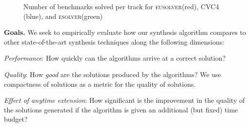 \documentclass{llncs}
\renewcommand{\paragraph}[1]{\par\noindent\textbf{#1.}}
\newcommand{\esolver}{\textsc{esolver}\xspace}
\newcommand{\eusolver}{\textsc{eusolver}\xspace}
\begin{document}
\solvedData
\begin{wrapfigure}{l}{0.4\textwidth}%
\centering
  \caption{Number of benchmarks solved per track for \eusolver (red),
  CVC4 (blue), and \esolver (green)}
    \label{fig:num_solved}
\vspace*{-1ex}
\end{wrapfigure}
\paragraph{Goals}
We seek to empirically evaluate how our synthesis algorithm compares
to other state-of-the-art synthesis techniques along the following
dimensions:
\begin{inparaenum}[(a)]
\item
\emph{Performance}: How quickly can the algorithms arrive at a correct
solution?
\item
\emph{Quality}: How \emph{good} are the solutions produced by the
algorithms? We use compactness of solutions
as a metric for the quality of solutions.
\item
\emph{Effect of anytime extension}: How significant is the
improvement in the quality of the solutions generated
if the algorithm is given an additional (but fixed) time budget?
\end{inparaenum}
\end{document}
